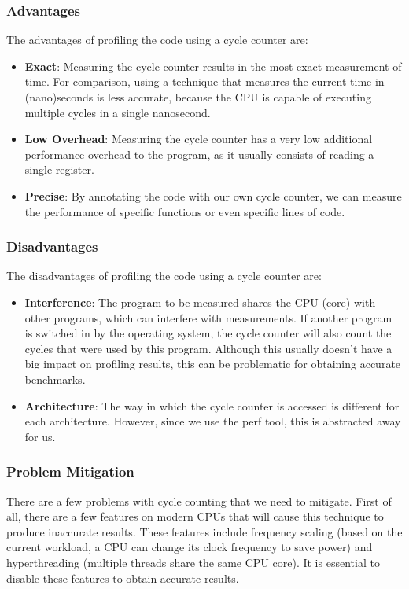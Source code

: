 \documentclass[11pt,a4paper]{report}
\theoremstyle{definition}
\begin{document}
\subsubsection{Advantages}
The advantages of profiling the code using a cycle counter are:
\begin{itemize}
  \item \textbf{Exact}: Measuring the cycle counter results in the most exact measurement of time. For comparison, using a technique that measures the current time in (nano)seconds is less accurate, because the CPU is capable of executing multiple cycles in a single nanosecond.
  \item \textbf{Low Overhead}: Measuring the cycle counter has a very low additional performance overhead to the program, as it usually consists of reading a single register.
  \item \textbf{Precise}: By annotating the code with our own cycle counter, we can measure the performance of specific functions or even specific lines of code.
\end{itemize}

\subsubsection{Disadvantages}
The disadvantages of profiling the code using a cycle counter are:
\begin{itemize}
  \item \textbf{Interference}: The program to be measured shares the CPU (core) with other programs, which can interfere with measurements. If another program is switched in by the operating system, the cycle counter will also count the cycles that were used by this program. Although this usually doesn't have a big impact on profiling results, this can be problematic for obtaining accurate benchmarks.
  \item \textbf{Architecture}: The way in which the cycle counter is accessed is different for each architecture. However, since we use the perf tool, this is abstracted away for us.
\end{itemize}

\subsubsection{Problem Mitigation}
There are a few problems with cycle counting that we need to mitigate. First of all, there are a few features on modern CPUs that will cause this technique to produce inaccurate results. These features include frequency scaling (based on the current workload, a CPU can change its clock frequency to save power) and hyperthreading (multiple threads share the same CPU core). It is essential to disable these features to obtain accurate results.
\end{document}
